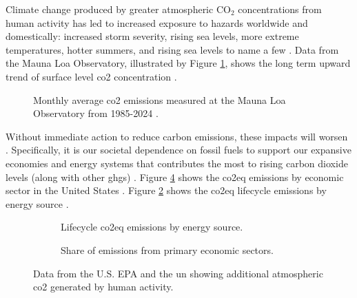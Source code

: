 Climate change produced by greater atmospheric CO$_2$ concentrations
\cite{kane_atmospheric_1996} from human activity has led to increased exposure
to hazards worldwide and domestically: increased storm severity, rising sea
levels, more extreme temperatures, hotter summers, and rising sea levels to name
a few \cite{reidmiller_fourth_2018}. Data from the Mauna Loa Observatory,
illustrated by Figure \ref{fig:mauna-loa-co2}, shows the long term upward trend
of surface level \ac{co2} concentration \cite{kane_atmospheric_1996}.
\begin{figure}[ht!]
    \centering
    \resizebox{0.9\columnwidth}{!}{}
    \caption{Monthly average \ac{co2} emissions measured at the Mauna Loa
    Observatory from 1985-2024 \cite{kane_atmospheric_1996}.}
    \label{fig:mauna-loa-co2}
\end{figure}

Without immediate action to reduce carbon emissions, these impacts will worsen
\cite{intergovernmental_panel_on_climate_change_climate_2014}. Specifically, it
is our societal dependence on fossil fuels to support our expansive economies
and energy systems that contributes the most to rising carbon dioxide levels
(along with other \acp{ghg}) \cite{epa_inventory_2023}. Figure
\ref{fig:emissions-by-sector} shows the \ac{co2eq} emissions by economic sector
in the United States \cite{epa_inventory_2023}. Figure
\ref{fig:emissions-by-source} shows the \ac{co2eq} lifecycle emissions by energy
source \cite{united_nations_economic_commission_for_europe_carbon_2022}. 

\begin{figure}[ht!]
    \centering
    \begin{subfigure}{0.7\columnwidth}
        \centering
        \resizebox{\textwidth}{!}{}
        \caption{Lifecycle \ac{co2eq} emissions by energy source.}
        \label{fig:emissions-by-source}
    \end{subfigure}
    \begin{subfigure}{0.7\columnwidth}
        \centering
        \resizebox{\textwidth}{!}{}
        \caption{Share of emissions from primary economic sectors.}
        \label{fig:emissions-by-sector}
    \end{subfigure}
    \caption{Data from the U.S. EPA and the \ac{un} showing additional atmospheric \ac{co2}
    generated by human activity.}
\end{figure}
\FloatBarrier

